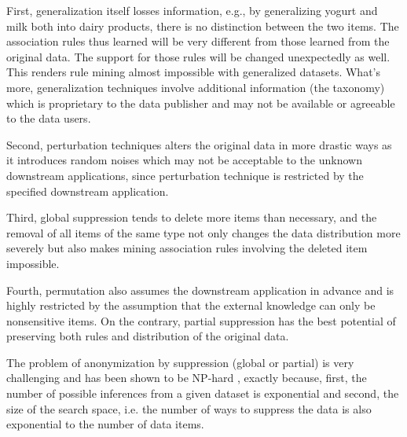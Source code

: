 First, generalization itself losses
information, e.g., by generalizing yogurt and milk both into dairy products,
there is no distinction between the two items. The association rules thus
learned will be very different from those learned from the original data. The
support for those rules will be changed unexpectedly as well. This renders
rule mining almost impossible with generalized datasets. What's more,
generalization techniques involve additional information (the taxonomy) which
is proprietary to the data publisher and may not be available or agreeable to
the data users.

Second, perturbation techniques alters the original
data in more drastic ways as it introduces random noises which may not be
acceptable to the unknown downstream applications, since perturbation
technique is restricted by the specified downstream application.

Third, global suppression tends to delete more items than necessary,
and the removal of all items of the same type not only changes the
data distribution more severely but also makes mining association rules
involving the deleted item impossible.

Fourth, permutation also assumes the downstream
application in advance and is highly restricted by the assumption that the
external knowledge can only be nonsensitive items.
On the contrary, partial suppression has the best potential of
preserving both rules and distribution of the original data.

The problem of anonymization by suppression (global or partial) is very
challenging and has been shown to be NP-hard \cite{atallah99:disclosure,
Xu:2008:ATD}, exactly because, first, the number of possible inferences from
a given dataset is exponential and second, the size of the search space, i.e.
the number of ways to suppress the data is also exponential to the number of
data items. %

